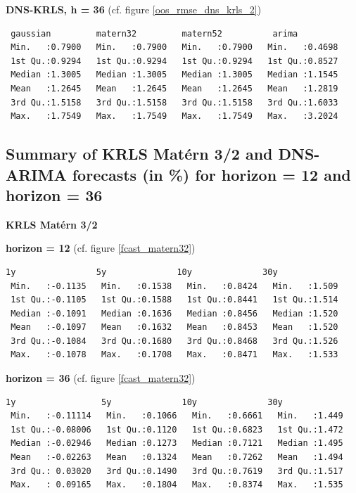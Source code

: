 \textbf{DNS-KRLS, h = 36} (cf. figure \ref{oos_rmse_dns_krls_2})

\begin{verbatim}
 gaussian         matern32         matern52          arima       
 Min.   :0.7900   Min.   :0.7900   Min.   :0.7900   Min.   :0.4698  
 1st Qu.:0.9294   1st Qu.:0.9294   1st Qu.:0.9294   1st Qu.:0.8527  
 Median :1.3005   Median :1.3005   Median :1.3005   Median :1.1545  
 Mean   :1.2645   Mean   :1.2645   Mean   :1.2645   Mean   :1.2819  
 3rd Qu.:1.5158   3rd Qu.:1.5158   3rd Qu.:1.5158   3rd Qu.:1.6033  
 Max.   :1.7549   Max.   :1.7549   Max.   :1.7549   Max.   :3.2024  
\end{verbatim}



\subsection{Summary of KRLS Mat\'ern 3/2 and DNS-ARIMA forecasts (in \%) for horizon = 12 and horizon = 36}
\label{appendix_summary_forecast}

\textbf{KRLS Mat\'ern 3/2}

\textbf{horizon = 12} (cf. figure \ref{fcast_matern32})

\begin{verbatim}
1y                5y              10y              30y       
 Min.   :-0.1135   Min.   :0.1538   Min.   :0.8424   Min.   :1.509  
 1st Qu.:-0.1105   1st Qu.:0.1588   1st Qu.:0.8441   1st Qu.:1.514  
 Median :-0.1091   Median :0.1636   Median :0.8456   Median :1.520  
 Mean   :-0.1097   Mean   :0.1632   Mean   :0.8453   Mean   :1.520  
 3rd Qu.:-0.1084   3rd Qu.:0.1680   3rd Qu.:0.8468   3rd Qu.:1.526  
 Max.   :-0.1078   Max.   :0.1708   Max.   :0.8471   Max.   :1.533
\end{verbatim}

\textbf{horizon = 36} (cf. figure \ref{fcast_matern32})

\begin{verbatim}
1y                 5y              10y              30y       
 Min.   :-0.11114   Min.   :0.1066   Min.   :0.6661   Min.   :1.449  
 1st Qu.:-0.08006   1st Qu.:0.1120   1st Qu.:0.6823   1st Qu.:1.472  
 Median :-0.02946   Median :0.1273   Median :0.7121   Median :1.495  
 Mean   :-0.02263   Mean   :0.1324   Mean   :0.7262   Mean   :1.494  
 3rd Qu.: 0.03020   3rd Qu.:0.1490   3rd Qu.:0.7619   3rd Qu.:1.517  
 Max.   : 0.09165   Max.   :0.1804   Max.   :0.8374   Max.   :1.535 
\end{verbatim}

